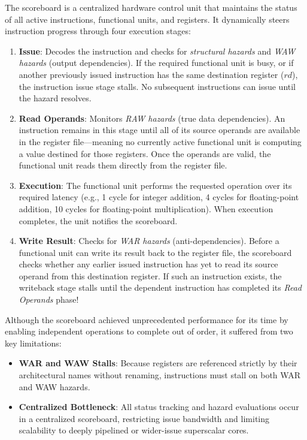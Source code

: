 The scoreboard is a centralized hardware control unit that maintains the status of all active instructions, functional units, and registers. It dynamically steers instruction progress through four execution stages:
\begin{enumerate}
    \item \textbf{Issue}: Decodes the instruction and checks for \textit{structural hazards} and \textit{WAW hazards} (output dependencies). If the required functional unit is busy, or if another previously issued instruction has the same destination register ($rd$), the instruction issue stage stalls. No subsequent instructions can issue until the hazard resolves.
    
    \item \textbf{Read Operands}: Monitors \textit{RAW hazards} (true data dependencies). An instruction remains in this stage until all of its source operands are available in the register file---meaning no currently active functional unit is computing a value destined for those registers. Once the operands are valid, the functional unit reads them directly from the register file.
    
    \item \textbf{Execution}: The functional unit performs the requested operation over its required latency (e.g., 1 cycle for integer addition, 4 cycles for floating-point addition, 10 cycles for floating-point multiplication). When execution completes, the unit notifies the scoreboard.
    
    \item \textbf{Write Result}: Checks for \textit{WAR hazards} (anti-dependencies). Before a functional unit can write its result back to the register file, the scoreboard checks whether any earlier issued instruction has yet to read its source operand from this destination register. If such an instruction exists, the writeback stage stalls until the dependent instruction has completed its \textit{Read Operands} phase!
\end{enumerate}

Although the scoreboard achieved unprecedented performance for its time by enabling independent operations to complete out of order, it suffered from two key limitations:
\begin{itemize}
    \item \textbf{WAR and WAW Stalls}: Because registers are referenced strictly by their architectural names without renaming, instructions must stall on both WAR and WAW hazards.
    \item \textbf{Centralized Bottleneck}: All status tracking and hazard evaluations occur in a centralized scoreboard, restricting issue bandwidth and limiting scalability to deeply pipelined or wider-issue superscalar cores.
\end{itemize}

